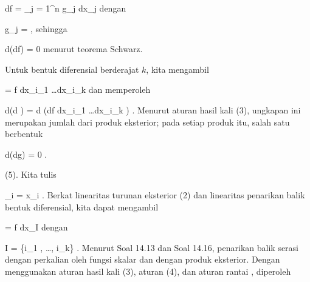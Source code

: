 {{\mavergleichskette
{\vergleichskette
{ df
}
{ = }{ \sum_{j = 1}^n g_j dx_j
}
{  }{
}
{    }{
}
{   }{
}
}
{}{}{}
dengan

\mavergleichskette
{\vergleichskette
{ g_j
}
{ = }{ {  }
}
{  }{
}
{    }{
}
{   }{
}
}
{}{}{,}
sehingga

\mavergleichskette
{\vergleichskette
{ d(df)
}
{ = }{ 0
}
{  }{
}
{    }{
}
{   }{
}
}
{}{}{}
menurut
teorema Schwarz.

Untuk bentuk diferensial berderajat $k$, kita mengambil

\mavergleichskette
{\vergleichskette
{ \omega
}
{ = }{ f dx_{i_1 } \wedge \ldots \wedge dx_{i_k }
}
{  }{
}
{    }{
}
{   }{
}
}
{}{}{}
dan memperoleh

\mavergleichskettedisp
{\vergleichskette
{ d(d \omega)
}
{ =} { d (df \wedge  dx_{i_1 } \wedge \ldots \wedge dx_{i_k })
}
{ } {
}
{ } {
}
{ } {
}
}
{}{}{.}
Menurut aturan hasil kali (3), ungkapan ini merupakan jumlah dari
 produk eksterior; pada setiap produk itu, salah satu  berbentuk

\mavergleichskette
{\vergleichskette
{ d(dg)
}
{ = }{ 0
}
{  }{
}
{    }{
}
{   }{
}
}
{}{}{.}}
{}

\teilbeweis {}{}{}
{(5). Kita tulis

\mavergleichskettedisp
{\vergleichskette
{ \psi_i
}
{ =} { x_i \circ \psi
}
{ } {
}
{ } {
}
{ } {
}
}
{}{}{.}
Berkat linearitas turunan eksterior (2) dan
linearitas penarikan balik bentuk diferensial,
kita dapat mengambil

\mavergleichskette
{\vergleichskette
{ \omega
}
{ = }{ f dx_I
}
{  }{
}
{    }{
}
{   }{
}
}
{}{}{}
dengan

\mavergleichskette
{\vergleichskette
{ I
}
{ = }{ \{i_1 , \ldots , i_k\}
}
{  }{
}
{    }{
}
{   }{
}
}
{}{}{.}
Menurut
Soal 14.13
dan
Soal 14.16,
penarikan balik serasi dengan perkalian oleh fungsi skalar dan dengan produk eksterior. Dengan menggunakan aturan hasil kali (3), aturan (4), dan
aturan rantai
 {} {,}
diperoleh

}}
